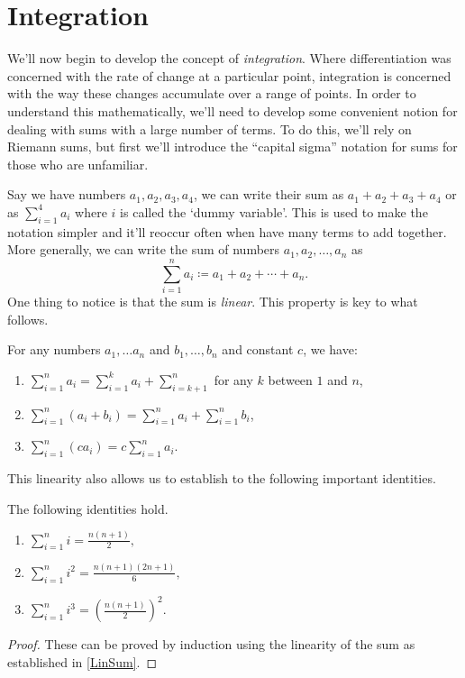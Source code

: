 
\section{Integration}

We'll now begin to develop the concept of \emph{integration}. Where differentiation was concerned with the rate of change at a particular point, integration is concerned with the way these changes accumulate over a range of points. In order to understand this mathematically, we'll need to develop some convenient notion for dealing with sums with a large number of terms. To do this, we'll rely on Riemann sums, but first we'll introduce the ``capital sigma'' notation for sums for those who are unfamiliar.


Say we have numbers $a_1, a_2, a_3, a_4$, we can write their sum as $a_1+a_2+a_3+a_4$ or as $\sum_{i=1}^4a_i$ where $i$ is called the `dummy variable'. This is used to make the notation simpler and it'll reoccur often when have many terms to add together. More generally, we can write the sum of numbers $a_1, a_2,\dotsc, a_n$ as
\begin{equation}
\sum_{i=1}^{n}a_i \coloneqq a_1+a_2+\dotsb+a_n.
\end{equation}
One thing to notice is that the sum is \emph{linear}. This property is key to what follows.

\begin{lem}\label{LinSum}
  For any numbers $a_1, \dotsc a_n$ and $b_1, \dotsc, b_n$ and constant $c$, we have:
  \begin{enumerate}
    \item $\sum_{i=1}^{n}a_i=\sum_{i=1}^{k}a_i+\sum_{i=k+1}^{n}$ for any $k$ between $1$ and $n$,
    \item $\sum_{i=1}^{n}(a_i+b_i)=\sum_{i=1}^{n}a_i+\sum_{i=1}^{n}b_i$,
    \item $\sum_{i=1}^{n}(ca_i)=c\sum_{i=1}^{n}a_i.$
  \end{enumerate}
\end{lem}


This linearity also allows us to establish to the following important identities.

\begin{lem}\label{IntegerSums}
  The following identities hold.
\begin{enumerate}
  \item $\sum_{i=1}^{n}i=\frac{n(n+1)}{2},$
  \item $\sum_{i=1}^{n}i^2=\frac{n(n+1)(2n+1)}{6},$
  \item $\sum_{i=1}^{n}i^3=\left(\frac{n(n+1)}{2} \right)^2.$
\end{enumerate}
\end{lem}
\begin{proof}
  These can be proved by induction using the linearity of the sum as established in \cref{LinSum}.
\end{proof}

